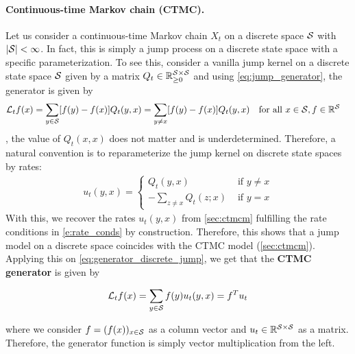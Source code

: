 \documentclass{fairmeta}
\newcommand{\highlight}[1]{{\color{metablue} \textbf{#1}}}
\numberwithin{equation}{section}
\begin{document}
\paragraph{Continuous-time Markov chain (CTMC).} Let us consider a continuous-time Markov chain $X_t$ on a discrete space ${\mathcal{S}}$ with $|{\mathcal{S}}|<\infty$.  In fact, this is simply a jump process on a discrete state space with a specific parameterization.  To see this, consider a vanilla jump kernel on a discrete state space ${\mathcal{S}}$ given by a matrix $Q_t\in \mathbb{R}^{{\mathcal{S}}\times {\mathcal{S}}}_{\geq 0}$ and using \cref{eq:jump_generator}, the generator is given by 
\begin{align}
\label{eq:generator_discrete_jump}
    \mathcal{L}_t f(x)&=\sum\limits_{y\in {\mathcal{S}}}[f(y)-f(x)]Q_t(y,x)=\sum\limits_{y\neq x}[f(y)-f(x)]Q_t(y,x)\quad \text{for all }x\in{\mathcal{S}}, f\in\mathbb{R}^{{\mathcal{S}}}
\end{align}
\ie, the value of $Q_t(x,x)$ does not matter and is underdetermined. Therefore, a natural convention is to reparameterize the jump kernel on discrete state spaces by rates:  
\begin{align*}
    u_t(y,x)=\begin{cases} Q_t(y,x) & \text{ if }y\neq x\\
    -\sum\limits_{z\neq x}Q_t(z;x) & \text{ if }y=x
\end{cases}
\end{align*}
With this, we recover the rates $u_t(y,x)$ from \cref{sec:ctmcm} fulfilling the rate conditions in \ref{e:rate_conds} by construction. Therefore, this shows that a jump model on a discrete space coincides with the CTMC model (\cref{sec:ctmcm}). Applying this on \cref{eq:generator_discrete_jump},  we get that the \highlight{CTMC generator} is given by
\begin{myframe}
\begin{equation}
\label{eq:ctmc_generator}
  \mathcal{L}_t f(x) =\sum\limits_{y\in {\mathcal{S}}}f(y)u_t(y,x)=f^Tu_t
\end{equation}
\end{myframe}
where we consider $f=(f(x))_{x\in {\mathcal{S}}}$ as a column vector and $u_t\in\mathbb{R}^{{\mathcal{S}} \times {\mathcal{S}}}$ as a matrix. Therefore, the generator function is simply vector multiplication from the left.
\end{document}
